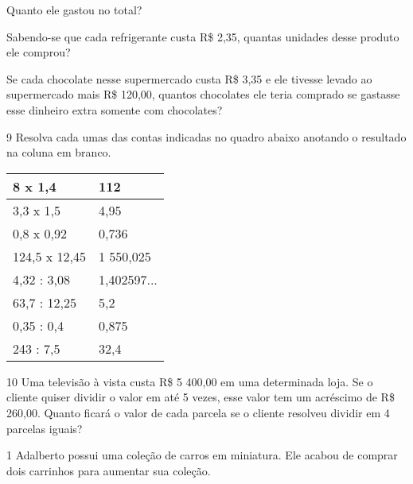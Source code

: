 \begin{escolha}
\item
  Quanto ele gastou no total?


\item
  Sabendo-se que cada refrigerante custa R\$ 2,35, quantas unidades
  desse produto ele comprou?


\item
  Se cada chocolate nesse supermercado custa R\$ 3,35 e ele tivesse
  levado ao supermercado mais R\$ 120,00, quantos chocolates ele teria
  comprado se gastasse esse dinheiro extra somente com chocolates?

\end{escolha}


\num{9} Resolva cada umas das contas indicadas no quadro abaixo anotando o
resultado na coluna em branco.

\begin{longtable}[]{@{}ll@{}}
\toprule
8 x 1,4 & 112\tabularnewline
\midrule
\endhead
3,3 x 1,5 & 4,95\tabularnewline
0,8 x 0,92 & 0,736\tabularnewline
124,5 x 12,45 & 1 550,025\tabularnewline
4,32 : 3,08 & 1,402597...\tabularnewline
63,7 : 12,25 & 5,2\tabularnewline
0,35 : 0,4 & 0,875\tabularnewline
243 : 7,5 & 32,4\tabularnewline
\bottomrule
\end{longtable}

\num{10} Uma televisão à vista custa R\$ 5 400,00 em uma determinada loja.
Se o cliente quiser dividir o valor em até 5 vezes, esse valor tem um
acréscimo de R\$ 260,00. Quanto ficará o valor de cada parcela se o
cliente resolveu dividir em 4 parcelas iguais?




\num{1} Adalberto possui uma coleção de carros em miniatura. Ele acabou de
comprar dois carrinhos para aumentar sua coleção.


